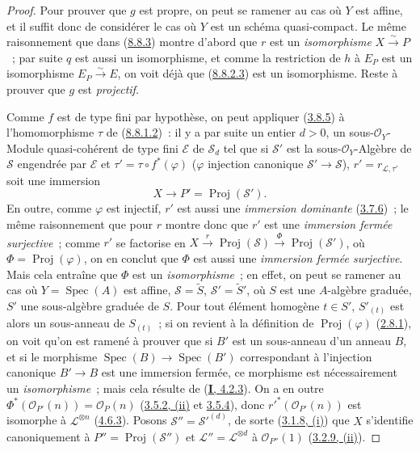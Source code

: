 \begin{proof}
Pour prouver que $g$ est propre, on peut se ramener au cas où $Y$ est affine,
et il suffit donc de considérer le cas où $Y$ est un schéma quasi-compact. Le
même raisonnement que dans (\hyperref[II.8.8.3-fr]{8.8.3}) montre d'abord que
$r$ est un \emph{isomorphisme} $X\xrightarrow{\sim}P$~; par suite $q$ est aussi
un isomorphisme, et comme la restriction de $h$ à $E_P$ est un isomorphisme
$E_P\xrightarrow{\sim}E$, on voit déjà que
(\hyperref[II.8.8.2.3-fr]{8.8.2.3}) est un isomorphisme. Reste à prouver que
$g$ est \emph{projectif}.

Comme $f$ est de type fini par hypothèse, on peut appliquer
(\hyperref[II.3.8.5-fr]{3.8.5}) à l'homomorphisme
$\tau$ de (\hyperref[II.8.8.1.2-fr]{8.8.1.2})~: il y a par suite un entier
$d>0$, un sous-$\mathcal{O}_Y$-Module quasi-cohérent de type fini
$\mathcal{E}$ de $\mathcal{S}_d$ tel que si $\mathcal{S}'$ est la
sous-$\mathcal{O}_Y$-Algèbre de $\mathcal{S}$ engendrée par $\mathcal{E}$ et
$\tau'=\tau\circ f^*(\varphi)$ ($\varphi$ injection canonique
$\mathcal{S}'\to\mathcal{S}$), $r'=r_{\mathcal{L},\tau'}$ soit une immersion
\[
  X\longrightarrow P'=\operatorname{Proj}(\mathcal{S}').
\]
En outre, comme $\varphi$ est injectif, $r'$ est aussi une \emph{immersion
dominante} (\hyperref[II.3.7.6-fr]{3.7.6})~; le même raisonnement que pour $r$
montre donc que $r'$ est une \emph{immersion fermée surjective}~; comme $r'$ se
factorise en
$X\xrightarrow{r}\operatorname{Proj}(\mathcal{S})
\xrightarrow{\Phi}\operatorname{Proj}(\mathcal{S}')$, où
$\Phi=\operatorname{Proj}(\varphi)$, on en conclut que $\Phi$ est aussi une
\emph{immersion fermée surjective}. Mais cela entraîne que $\Phi$ est un
\emph{isomorphisme}~; en effet, on peut se ramener au cas où
$Y=\operatorname{Spec}(A)$ est affine, $\mathcal{S}=\widetilde{S}$,
$\mathcal{S}'=\widetilde{S}'$, où $S$ est une $A$-algèbre graduée, $S'$ une
sous-algèbre graduée de $S$. Pour tout élément homogène $t\in S'$,
$S'_{(t)}$ est alors un sous-anneau de $S_{(t)}$~; si on revient à la
définition de $\operatorname{Proj}(\varphi)$
(\hyperref[II.2.8.1-fr]{2.8.1}), on voit qu'on est ramené à prouver que si
$B'$ est un sous-anneau d'un anneau $B$, et si le morphisme
$\operatorname{Spec}(B)\to\operatorname{Spec}(B')$ correspondant à l'injection
canonique $B'\to B$ est une immersion fermée, ce morphisme est nécessairement
un \emph{isomorphisme}~; mais cela résulte de
(\hyperref[I.4.2.3-fr]{\textbf{I}, 4.2.3}).
On a en outre
$\Phi^*(\mathcal{O}_{P'}(n))=\mathcal{O}_P(n)$
(\hyperref[II.3.5.2-fr]{3.5.2, (ii)} et
\hyperref[II.3.5.4-fr]{3.5.4}), donc
$r'^*(\mathcal{O}_{P'}(n))$ est isomorphe à $\mathcal{L}^{\otimes n}$
(\hyperref[II.4.6.3-fr]{4.6.3}). Posons
$\mathcal{S}''=\mathcal{S}'^{(d)}$, de sorte
(\hyperref[II.3.1.8-fr]{3.1.8, (i)}) que $X$ s'identifie canoniquement à
$P''=\operatorname{Proj}(\mathcal{S}'')$ et
$\mathcal{L}''=\mathcal{L}^{\otimes d}$ à $\mathcal{O}_{P''}(1)$
(\hyperref[II.3.2.9-fr]{3.2.9, (ii)}).


\end{proof}
